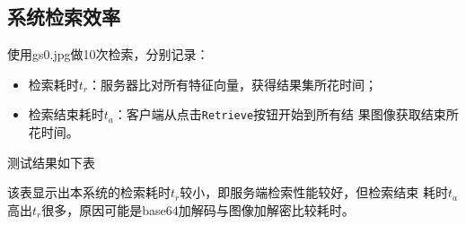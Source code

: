 \subsection{系统检索效率}
\label{sec:sys-retrieval-effi}

使用gs0.jpg做10次检索，分别记录：
\begin{itemize}
\item 检索耗时$t_r$：服务器比对所有特征向量，获得结果集所花时间；
\item 检索结束耗时$t_a$：客户端从点击\texttt{Retrieve}按钮开始到所有结
  果图像获取结束所花时间。
\end{itemize}

测试结果如下表



该表显示出本系统的检索耗时$t_r$较小，即服务端检索性能较好，但检索结束
耗时$t_a$高出$t_r$很多，原因可能是base64加解码与图像加解密比较耗时。
